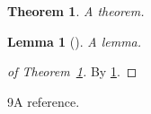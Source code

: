 \documentclass{article}
\newtheorem{theorem}{Theorem}
\newtheorem{lemma}{Lemma}
\begin{document}
\begin{theorem}\label{t1}A theorem.\end{theorem}

\begin{lemma}[{\cite[p.~37]{a-l}}]\label{l1}A lemma.\end{lemma}

\begin{proof}[{of Theorem~\ref{t1}}]
  By \ref{l1}.
\end{proof}

\begin{thebibliography}{9}A reference.\end{thebibliography}
\end{document}
